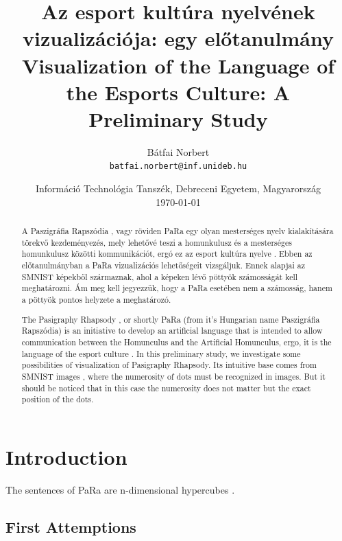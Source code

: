 \documentclass[a4paper]{article}
\begin{document}
\title{Az esport kultúra nyelvének vizualizációja: egy el\H otanulmány\\Visualization of the Language of the Esports Culture: A Preliminary Study}
\author{
	Bátfai Norbert\\
	\texttt{batfai.norbert@inf.unideb.hu}}
\date{
    Információ Technológia Tanszék, Debreceni Egyetem, Magyarország\\
    \today
}

\maketitle

\begin{abstract}
A Paszigráfia Rapszódia \cite{PARAREPO}, vagy röviden PaRa egy olyan mesterséges nyelv kialakítására törekv\H o kezdeményezés, mely lehetővé teszi a homunkulusz és a mesterséges homunkulusz közötti kommunikációt, ergó ez az esport kultúra nyelve \cite{MITEL}. Ebben az el\H otanulmányban a PaRa vizualizációs lehetőségeit vizsgáljuk. Ennek alapjai az SMNIST \cite{SMNIST} képekb\H ol származnak, ahol a képeken lév\H o pöttyök számosságát kell meghatározni. Ám meg kell jegyezzük, hogy a PaRa esetében nem a számosság, hanem a pöttyök pontos helyzete a meghatározó.
\end{abstract}

{
\begin{abstract}
The Pasigraphy Rhapsody \cite{PARAREPO}, or shortly PaRa (from it's Hungarian name Paszigr\'afia Rapsz\'odia) is an initiative to develop an artificial language that is intended to allow communication between the Homunculus and the Artificial Homunculus, ergo, it is the language of the esport culture \cite{MITEL}. In this preliminary study, we investigate some possibilities of visualization of Pasigraphy Rhapsody. Its intuitive base comes from SMNIST images \cite{SMNIST}, where the numerosity of dots must be recognized in images. But it should be noticed that in this case the numerosity does not matter but the exact position of the dots.
\end{abstract}
}
 
\section{Introduction}

The sentences of PaRa are n-dimensional hypercubes \cite{CONPARA}.

\subsection{First Attemptions}
\end{document}
